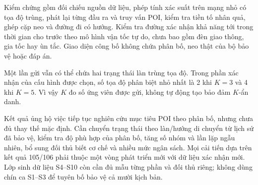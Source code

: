 Kiểm chứng gồm đối chiếu nguồn dữ liệu, phép tính xác suất trên mạng nhỏ có tọa độ trùng, phát lại từng đầu ra và truy vấn POI, kiểm tra tiền tố nhân quả, ghép cặp neo và đường đi có hướng. Kiểm tra đường xác nhận khả năng tới trong thời gian cho trước theo mô hình vận tốc tự do, chưa bao gồm đèn giao thông, gia tốc hay ùn tắc. Giao diện công bố không chứa phân bố, neo thật của bộ bảo vệ hoặc đáp án.

Một lần gửi vẫn có thể chứa hai trạng thái làn trùng tọa độ. Trong phần xác nhận của cấu hình được chọn, số tọa độ phân biệt nhỏ nhất là 2 khi $K=3$ và 4 khi $K=5$. Vì vậy $K$ đo số ứng viên được gửi, không tự động tạo bảo đảm $K$-ẩn danh.

Kết quả ủng hộ việc tiếp tục nghiên cứu mục tiêu POI theo phân bố, nhưng chưa đủ thay thế mặc định. Cần chuyển trạng thái theo làn/hướng di chuyển từ lịch sử đã bảo vệ, kiểm tra độ phù hợp của phân bố, tăng số nhóm và lần lặp ngẫu nhiên, bổ sung đối thủ biết cơ chế và nhiều mức ngân sách. Mọi cải tiến dựa trên kết quả 105/106 phải thuộc một vòng phát triển mới với dữ liệu xác nhận mới. Lớp sinh dữ liệu S4--S10 còn cần đủ mẫu từng phần và đối thủ riêng; không dùng chín ca S1--S3 để tuyên bố bảo vệ cả mười kịch bản.
